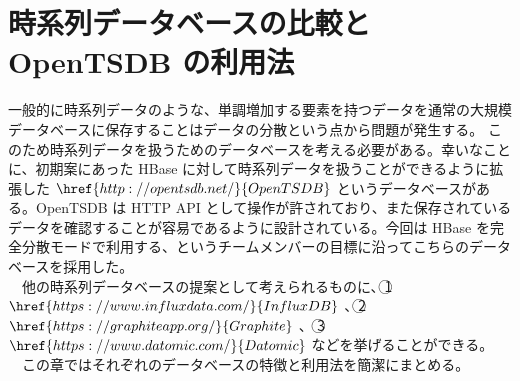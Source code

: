 \documentclass[dvipdfmx]{scrartcl}
\begin{document}
\section{時系列データベースの比較と OpenTSDB の利用法}
\label{sec:orge23892e}
一般的に時系列データのような、単調増加する要素を持つデータを通常の大規模データベースに保存することはデータの分散という点から問題が発生する。 \cite{hbase-reference} このため時系列データを扱うためのデータベースを考える必要がある。幸いなことに、初期案にあった HBase に対して時系列データを扱うことができるように拡張した \(\href{http://opentsdb.net/}{OpenTSDB}\) というデータベースがある。OpenTSDB は HTTP API として操作が許されており、また保存されているデータを確認することが容易であるように設計されている。今回は HBase を完全分散モードで利用する、というチームメンバーの目標に沿ってこちらのデータベースを採用した。\\
　他の時系列データベースの提案として考えられるものに、\textcircled{\scriptsize 1} \(\href{https://www.influxdata.com/}{InfluxDB}\) 、\textcircled{\scriptsize 2} \(\href{https://graphiteapp.org/}{Graphite}\) 、 \textcircled{\scriptsize 3} \(\href{https://www.datomic.com/}{Datomic}\) などを挙げることができる。\\
　この章ではそれぞれのデータベースの特徴と利用法を簡潔にまとめる。\\
\end{document}
